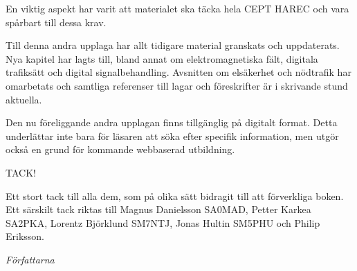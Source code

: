 En viktig aspekt har varit att materialet ska täcka hela CEPT HAREC och vara spårbart till dessa krav.

Till denna andra upplaga har allt tidigare material granskats och uppdaterats. Nya kapitel har lagts till, bland annat om elektromagnetiska fält, digitala trafiksätt och digital signalbehandling. Avsnitten om elsäkerhet och nödtrafik har omarbetats och samtliga referenser till lagar och föreskrifter är i skrivande stund aktuella.

Den nu föreliggande andra upplagan finns tillgänglig på digitalt format. Detta underlättar inte bara för läsaren att söka efter specifik information, men utgör också en grund för kommande webbaserad utbildning.



TACK!

Ett stort tack till alla dem, som på olika sätt bidragit till att förverkliga
boken. Ett särskilt tack riktas till Magnus Danielsson SA0MAD, Petter Karkea SA2PKA, Lorentz Björklund SM7NTJ, Jonas Hultin SM5PHU och Philip Eriksson.

\emph{Författarna}

